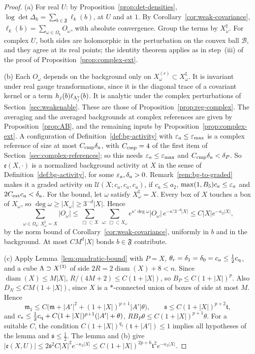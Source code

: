 \begin{proof}
(a) For real $U$: by Proposition~\ref{prop:det-densities}, $\log\det\Delta_k=\sum_{b\in\mathfrak F}\ell_k(b)$, at $U$ and at $1$. By Corollary~\ref{cor:weak-covariance}, $\ell_k(b)=\sum_{\omega\in\Omega_b}O_\omega$, with absolute convergence. Group the terms by $X^\sharp_\omega$. For complex $U$, both sides are holomorphic in the perturbation on the convex ball $\mathcal B$, and they agree at its real points; the identity theorem applies as in step~(iii) of the proof of Proposition~\ref{prop:complex-ext}.

(b) Each $O_\omega$ depends on the background only on $X_\omega^{(r)}\subset X^\sharp_\omega$. It is invariant under real gauge transformations, since it is the diagonal trace of a covariant kernel or a term $h_j(b)\ell_{\Lambda^v_j}(b)$. It is analytic under the complex perturbations of Section~\ref{sec:weakenable}. These are those of Proposition~\ref{prop:reg-complex}. The averaging and the averaged backgrounds at complex references are given by Proposition~\ref{prop:AB}, and the remaining inputs by Proposition~\ref{prop:complex-ext}. A configuration of Definition~\ref{def:bg-activity} with $\varepsilon_a\le\varepsilon_{\max}$ is a complex reference of size at most $C_{\rm cmp}\delta_a$, with $C_{\rm cmp}=4$ of the first item of Section~\ref{sec:complex-references}; so this needs $\varepsilon_a\le\varepsilon_{\max}$ and $C_{\rm cmp}\delta_a<\delta_P$. So $\mathfrak e(X,\cdot)$ is a normalized background activity at $X$ in the sense of Definition~\ref{def:bg-activity}, for some $\varepsilon_a,\delta_a>0$. Remark~\ref{rem:bg-to-graded} makes it a graded activity on $\mathcal U(X;c_a,c_a,c_a)$, if $c_a\le a_2$, $\max(1,B_5)c_a\le\varepsilon_a$ and $2C_{\rm ext}c_a<\delta_a$. For the bound, let $\omega$ satisfy $X^\sharp_\omega=X$. Every box of $X$ touches a box of $X_\omega$, so $\deg\omega\ge|X_\omega|\ge3^{-d}|X|$. Hence
\[
\sum_{\omega\in\Omega_b:\,X^\sharp_\omega=X}|O_\omega|\le\sum_{\Box\subset X}\ \sum_{\omega:\,\Box\subset X_\omega}e^{\kappa'\deg\omega}|O_\omega|\,e^{-\kappa'3^{-d}|X|}\le C|X|e^{-\kappa_2|X|},
\]
by the norm bound of Corollary~\ref{cor:weak-covariance}, uniformly in $b$ and in the background. At most $CM^d|X|$ bonds $b\in\mathfrak F$ contribute.

(c) Apply Lemma~\ref{lem:quadratic-bound} with $P=X$, $\theta_r=\delta_1=\delta_0=c_a\le\frac12c_{\rm q}$, and a cube $\Lambda\supset X^{(3)}$ of side $2R=2\operatorname{diam}(X)+8<n$. Since $\operatorname{diam}(X)\le M|X|$, $R/(4M+2)\le C(1+|X|)$, so $B_P\le C(1+|X|)^p$. Also $D_N\le CM(1+|X|)$, since $X$ is a $*$-connected union of boxes of side at most $M$. Hence
\[
\mathfrak m_1\le C\big(\mathfrak m+|A'|^2+(1+|X|)^{p+1}|A'|\theta\big),\qquad\mathfrak s\le C(1+|X|)^{p+2}\mathfrak t ,
\]
and $c_*\le\frac12c_{\rm q}+C(1+|X|)^{p+1}(|A'|+\theta)$, $RB_P\theta\le C(1+|X|)^{p+1}\theta$. For a suitable $C$, the condition $C(1+|X|)^{q_1}(\mathfrak t+|A'|)\le1$ implies all hypotheses of the lemma and $\mathfrak s\le\frac12$. The lemma and (b) give $|\mathfrak e(X,U)|\le2\mathfrak s^2C|X|^2e^{-\kappa_2|X|}\le C(1+|X|)^{2p+6}\mathfrak t^2e^{-\kappa_2|X|}$.


\end{proof}
